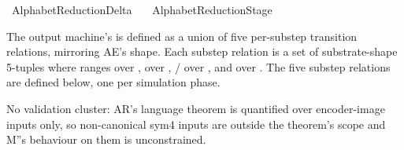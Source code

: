 %
\begin{isabellebody}%
%
%
\isadelimtheory
%
\endisadelimtheory
%
\isatagtheory
{}\isamarkupfalse%
\ AlphabetReduction{\isacharunderscore}{\kern0pt}Delta\isanewline
\ \ \ AlphabetReduction{\isacharunderscore}{\kern0pt}Stage\isanewline
{}%
\endisatagtheory
{\isafoldtheory}%
%
\isadelimtheory
%
\endisadelimtheory
%
\isadelimdocument
%
\endisadelimdocument
%
\isatagdocument
%
\isamarkuptrue%
%
\endisatagdocument
{\isafolddocument}%
%
\isadelimdocument
%
\endisadelimdocument
%
\begin{isamarkuptext}%
The output machine's \isa{{\isasymdelta}{\isacharprime}{\kern0pt}} is defined as a
  union of five per-substep transition relations, mirroring
  AE's  shape.  Each substep
  relation is a set of substrate-shape 5-tuples
   where
   ranges over , 
  over ,  /
   over , and
   over .  The five substep
  relations are defined below, one per simulation phase.

  No validation cluster: AR's language theorem is quantified
  over encoder-image inputs only, so non-canonical sym4 inputs
  are outside the theorem's scope and M''s behaviour on them is
  unconstrained.


\end{isamarkuptext}
\end{isabellebody}
